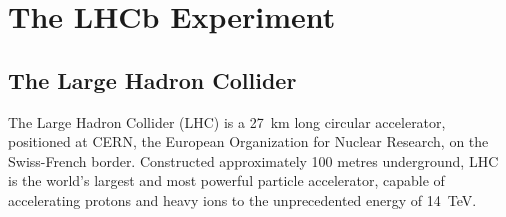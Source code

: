 
\chapter{The LHCb Experiment}
\label{chp:experiment}

\section{The Large Hadron Collider}
The Large Hadron Collider (LHC) is a \SI{27}{\kilo\meter} long circular accelerator, positioned at CERN, the European Organization for Nuclear Research, on the Swiss-French border. Constructed approximately 100  metres underground, LHC is the world's largest and most powerful particle accelerator, capable of accelerating protons and heavy ions to the unprecedented energy of \SI{14}{\tera\eV}.

